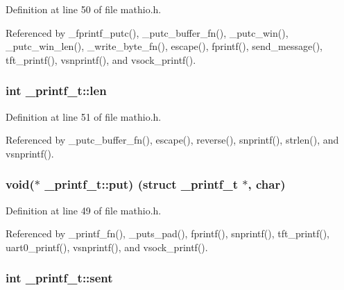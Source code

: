 Definition at line 50 of file mathio.\+h.



Referenced by \+\_\+fprintf\+\_\+putc(), \+\_\+putc\+\_\+buffer\+\_\+fn(), \+\_\+putc\+\_\+win(), \+\_\+putc\+\_\+win\+\_\+len(), \+\_\+write\+\_\+byte\+\_\+fn(), escape(), fprintf(), send\+\_\+message(), tft\+\_\+printf(), vsnprintf(), and vsock\+\_\+printf().

\subsubsection[{\texorpdfstring{len}{len}}]{\setlength{\rightskip}{0pt plus 5cm}int \+\_\+printf\+\_\+t\+::len}\hypertarget{struct__printf__t_a5139902cde74159b79e6418a34712bee}{}\label{struct__printf__t_a5139902cde74159b79e6418a34712bee}


Definition at line 51 of file mathio.\+h.



Referenced by \+\_\+putc\+\_\+buffer\+\_\+fn(), escape(), reverse(), snprintf(), strlen(), and vsnprintf().

\subsubsection[{\texorpdfstring{put}{put}}]{\setlength{\rightskip}{0pt plus 5cm}void($\ast$ \+\_\+printf\+\_\+t\+::put) (struct {\bf \+\_\+printf\+\_\+t} $\ast$, char)}\hypertarget{struct__printf__t_a3ef8eb0143b93d4446b04c6ce9313be7}{}\label{struct__printf__t_a3ef8eb0143b93d4446b04c6ce9313be7}


Definition at line 49 of file mathio.\+h.



Referenced by \+\_\+printf\+\_\+fn(), \+\_\+puts\+\_\+pad(), fprintf(), snprintf(), tft\+\_\+printf(), uart0\+\_\+printf(), vsnprintf(), and vsock\+\_\+printf().

\subsubsection[{\texorpdfstring{sent}{sent}}]{\setlength{\rightskip}{0pt plus 5cm}int \+\_\+printf\+\_\+t\+::sent}\hypertarget{struct__printf__t_a872716fd701166cd57bd3fffb7b77706}{}\label{struct__printf__t_a872716fd701166cd57bd3fffb7b77706}


